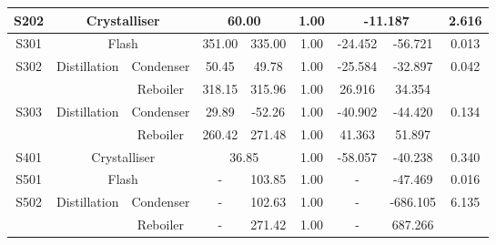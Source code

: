 \begin{table}[h]
{\begin{tabular}{|c|c|c|c|c|c|c|c|c|c|}
S202                  & \multicolumn{2}{c|}{Crystalliser}                   & \multicolumn{2}{c|}{60.00}            & 1.00                            & \multicolumn{2}{c|}{-11.187}        & \multicolumn{2}{c|}{2.616}                  \\ \hline
S301                  & \multicolumn{2}{c|}{Flash}                          & 351.00            & 335.00            & 1.00                            & -24.452          & -56.721          & \multicolumn{2}{c|}{0.013}                  \\ \hline
\multirow{2}{*}{S302} & \multirow{2}{*}{Distillation}       & Condenser     & 50.45             & 49.78             & 1.00                            & -25.584          & -32.897          & \multicolumn{2}{c|}{\multirow{2}{*}{0.042}} \\ \cline{3-8}
                      &                                     & Reboiler      & 318.15            & 315.96            & 1.00                            & 26.916           & 34.354           & \multicolumn{2}{c|}{}                       \\ \hline
\multirow{2}{*}{S303} & \multirow{2}{*}{Distillation}       & Condenser     & 29.89             & -52.26            & 1.00                            & -40.902          & -44.420          & \multicolumn{2}{c|}{\multirow{2}{*}{0.134}} \\ \cline{3-8}
                      &                                     & Reboiler      & 260.42            & 271.48            & 1.00                            & 41.363           & 51.897           & \multicolumn{2}{c|}{}                       \\ \hline
S401                  & \multicolumn{2}{c|}{Crystalliser}                   & \multicolumn{2}{c|}{36.85}            & 1.00                            & -58.057          & -40.238          & \multicolumn{2}{c|}{0.340}                  \\ \hline
S501                  & \multicolumn{2}{c|}{Flash}                          & -                 & 103.85            & 1.00                            & -                & -47.469          & \multicolumn{2}{c|}{0.016}                  \\ \hline
\multirow{2}{*}{S502} & \multirow{2}{*}{Distillation}       & Condenser     & -                 & 102.63            & 1.00                            & -                & -686.105         & \multicolumn{2}{c|}{\multirow{2}{*}{6.135}} \\ \cline{3-8}
                      &                                     & Reboiler      & -                 & 271.42            & 1.00                            & -                & 687.266          & \multicolumn{2}{c|}{}                       \\ \hline

\end{tabular}}
\end{table}
